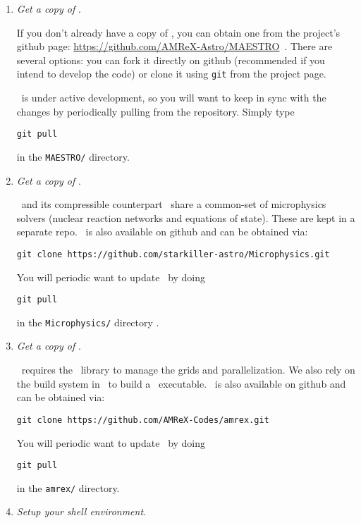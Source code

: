 \begin{enumerate}

\item {\em Get a copy of \maestro}.

  If you don't already have a copy of \maestro, you can obtain one
  from the project's {\sf github} page:
  \url{https://github.com/AMReX-Astro/MAESTRO}\, .  There are several
  options: you can fork it directly on {\sf github} (recommended if
  you intend to develop the code) or clone it using {\tt git} from the
  project page.

  \maestro\ is under active development, so you will want to keep in
  sync with the changes by periodically pulling from the repository.
  Simply type
  \begin{verbatim}
git pull
  \end{verbatim}
  in the {\tt MAESTRO/} directory.

\item {\em Get a copy of \microphysics}.

  \maestro\ and its compressible counterpart \castro\ share a
  common-set of microphysics solvers (nuclear reaction networks and
  equations of state).  These are kept in a separate repo.
  \microphysics\ is also available on github and can be obtained 
  via:
  \begin{verbatim}
git clone https://github.com/starkiller-astro/Microphysics.git
  \end{verbatim}

  You will periodic want to update \microphysics\ by doing
  \begin{verbatim}
git pull
  \end{verbatim}
  in the {\tt Microphysics/} directory
.
\item {\em Get a copy of \amrex}.

  \maestro\ requires the \amrex\ library to manage the grids and
  parallelization.  We also rely on the build system in \amrex\ to
  build a \maestro\ executable.  \amrex\ is also available on github
  and can be obtained via:
  \begin{verbatim}
git clone https://github.com/AMReX-Codes/amrex.git
  \end{verbatim}

  You will periodic want to update \amrex\ by doing
  \begin{verbatim}
git pull
  \end{verbatim}
  in the {\tt amrex/} directory.


\item {\em Setup your shell environment}.


\end{enumerate}
